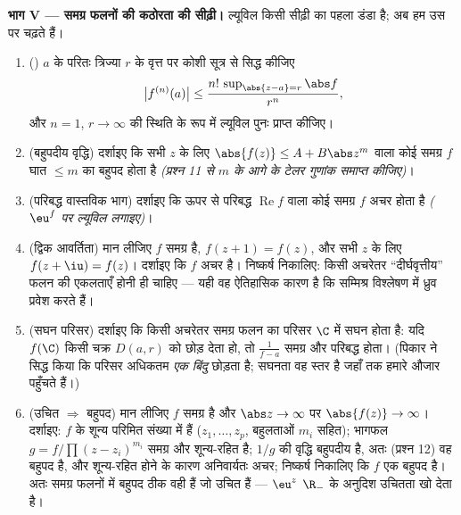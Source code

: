 \begin{problem}
\medskip
\noindent\textbf{भाग V --- समग्र फलनों की कठोरता की सीढ़ी।}
ल्यूविल किसी सीढ़ी का पहला डंडा है; अब हम उस पर चढ़ते हैं।
\begin{enumerate}[resume]
  \item () $a$ के परितः त्रिज्या $r$ के वृत्त पर कोशी
        सूत्र से सिद्ध कीजिए
        \[
        \bigl|f^{(n)}(a)\bigr| \leq
        \frac{n!\,\sup_{\abs{z-a}=r}\abs f}{r^n} ,
        \]
        और $n = 1$, $r \to
        \infty$ की स्थिति के रूप में ल्यूविल पुनः प्राप्त
        कीजिए।
  \item (बहुपदीय वृद्धि) दर्शाइए कि सभी $z$ के लिए $\abs{f(z)} \leq A + B\abs z^m$ वाला
        कोई समग्र $f$ घात $\leq m$ का बहुपद होता है \emph{(प्रश्न
        11 से $m$ के आगे के टेलर गुणांक समाप्त कीजिए)}।
  \item (परिबद्ध वास्तविक भाग) दर्शाइए कि ऊपर से परिबद्ध $\operatorname{Re}f$
        वाला कोई समग्र $f$ अचर होता है \emph{($\eu^{f}$ पर ल्यूविल
        लगाइए)}।
  \item (द्विक आवर्तिता) मान लीजिए $f$ समग्र है, $f(z + 1)
        = f(z)$, और सभी
        $z$ के लिए $f(z + \iu) = f(z)$। दर्शाइए कि $f$ अचर है। निष्कर्ष
        निकालिए: किसी अचरेतर ``दीर्घवृत्तीय'' फलन की एकलताएँ
        होनी ही चाहिए --- यही वह ऐतिहासिक कारण है कि सम्मिश्र
        विश्लेषण में ध्रुव प्रवेश करते हैं।
  \item (सघन परिसर) दर्शाइए कि किसी अचरेतर समग्र फलन का परिसर
        $\C$ में सघन होता है: यदि $f(\C)$ किसी चक्र $D(a, r)$ को छोड़
        देता हो, तो $\frac1{f - a}$ समग्र और परिबद्ध होता। (पिकार ने सिद्ध
        किया कि परिसर अधिकतम \emph{एक बिंदु} छोड़ता है; सघनता वह
        स्तर है जहाँ तक हमारे औजार पहुँचते हैं।)
  \item (उचित $\Rightarrow$ बहुपद) मान लीजिए $f$ समग्र है और $\abs z \to
        \infty$ पर
        $\abs{f(z)} \to \infty$। दर्शाइए: $f$ के शून्य परिमित संख्या में हैं
        ($z_1, \dots, z_p$, बहुलताओं $m_i$ सहित); भागफल $g = f/\prod(z - z_i)^{m_i}$ समग्र और
        शून्य-रहित है; $1/g$ की वृद्धि बहुपदीय है, अतः (प्रश्न 12)
        वह बहुपद है, और शून्य-रहित होने के कारण अनिवार्यतः अचर;
        निष्कर्ष निकालिए कि $f$ एक बहुपद है। अतः समग्र फलनों में
        बहुपद ठीक वही हैं जो उचित हैं --- $\eu^z$ $\R_-$ के अनुदिश
        उचितता खो देता है।
\end{enumerate}


\end{problem}
